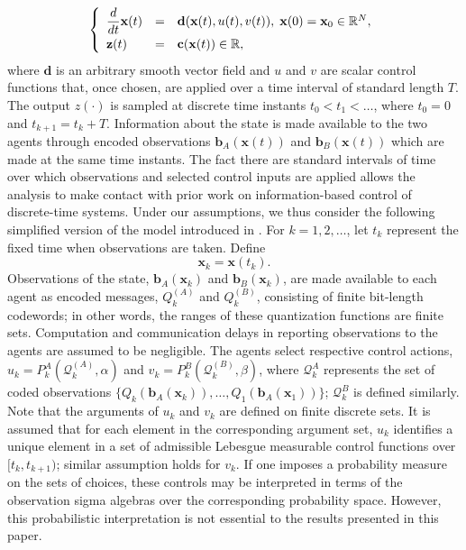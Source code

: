 \documentclass[12pt,onecolumn,draftcls]{IEEEtran}
\newcommand{\RR}{\mathbb{R}}
\newcommand{\bb}{\mathbf{b}}
\newcommand{\bx}{\mathbf{x}}
\newcommand{\cQ}{\mathcal{Q}}
\begin{document}
\begin{equation}
\left\{
\begin{array}{lll}
\dfrac{d}{dt}\mathbf{x}(t)&=& \mathbf{d}(\mathbf{x}(t),u(t),v(t)),\;\mathbf{x}(0) = \mathbf{x}_0 \in \RR^N,
\vspace{0.1cm}\\
{\bf z}(t)&=&{\bf c}(\bx(t)) \in \mathbb{R},
\end{array}
\right.
\label{eq:basic0}
\end{equation}
where $\mathbf{d}$ is an arbitrary smooth vector field and  $u$ and $v$ are scalar control functions that, once chosen, are applied over a time interval of standard length $T$.   The output $z(\cdot)$ is sampled at discrete time instants $t_0<t_1<\dots$, where $t_0=0$ and $t_{k+1}=t_k+T$.  Information about the state is made available to the two agents through encoded observations $\bb_A(\bx(t))$ and $\bb_B(\bx(t))$ which are made at the same time instants.
The fact there are standard intervals of time over which observations and selected control inputs are applied allows the analysis  to make contact with prior work on information-based control of discrete-time systems.  Under our assumptions, we thus consider
the following simplified version of the model introduced in \cite{Wong}.
For $k = 1, 2, \ldots$, let $t_k$ represent the fixed time when observations are taken. Define
\begin{equation}
\bx_k = \bx(t_k).
\end{equation}
Observations of the state,  $\bb_A(\bx_k)$ and $\bb_B(\bx_k)$, are made available to each agent
as encoded messages, $Q_k^{(A)}$ and $Q_k^{(B)}$, consisting of finite bit-length codewords; in other words, the ranges of these quantization functions are finite sets.  
Computation and communication delays in reporting observations to the agents are assumed to be negligible.
The agents select respective control actions,
$u_k = P_k^{A}(\cQ_k^{(A)}, \alpha)$ and $v_k = P_k^{B}(\cQ_k^{(B)}, \beta)$,
where $\cQ_k^{A}$ represents the set of coded observations
$\{Q_k(\bb_A(\bx_k)), \ldots, Q_1(\bb_A(\bx_1)) \}$; $\cQ_k^{B}$ is defined similarly.  Note that the arguments of $u_k$ and $v_k$ are defined on finite
discrete sets.  It is assumed that for each element in the corresponding argument set, $u_k$ identifies a unique element in a set of admissible Lebesgue measurable control functions over $[t_k, t_{k+1})$; similar assumption holds for $v_k$.
If one imposes a probability measure on the sets of choices, these controls may be interpreted in terms of the observation sigma algebras over the corresponding probability space.  However, this probabilistic interpretation is not essential to the results presented in this paper.
 
\end{document}

